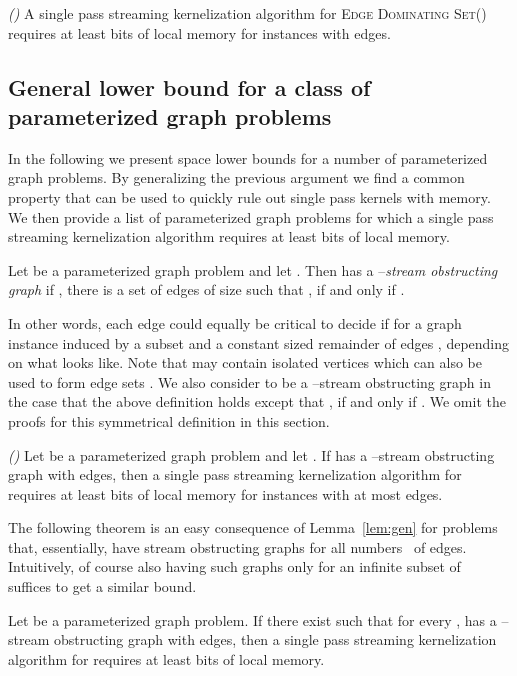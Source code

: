 \documentclass[draft,a4paper]{llncs}
\newcommand{\EDSk}{\textsc{Edge Dominating Set()}\xspace}
\begin{document}
\begin{theorem} \label{thm:eds}  \emph{()}
 A single pass streaming kernelization algorithm for \EDSk requires at least  bits of local memory for instances with  edges.
\end{theorem}


\subsection*{General lower bound for a class of parameterized graph problems}\label{ssec:singlepass:generallb}

In the following we present space lower bounds for a number of parameterized graph problems. By generalizing the previous argument we find a common property that can be used to quickly rule out single pass kernels with  memory. We then provide a list of parameterized graph problems for which a single pass streaming kernelization algorithm requires at least  bits of local memory.

\begin{definition}
 Let  be a parameterized graph problem and let . Then  has a --\emph{stream obstructing graph}  if , there is a set of edges  of size  such that ,  if and only if .
\end{definition}

In other words, each edge  could equally be critical to decide if  for a graph instance  induced by a subset  and a constant sized remainder of edges , depending on what  looks like. Note that  may contain isolated vertices which can also be used to form edge sets . We also consider  to be a --stream obstructing graph in the case that the above definition holds except that ,  if and only if . We omit the proofs for this symmetrical definition in this section.

\begin{lemma} \label{lem:gen} \emph{()}
 Let  be a parameterized graph problem and let . If  has a --stream obstructing graph  with  edges, then a single pass streaming kernelization algorithm for  requires at least  bits of local memory for instances with at most  edges.
\end{lemma}

The following theorem is an easy consequence of Lemma~\ref{lem:gen} for problems that, essentially, have stream obstructing graphs for all numbers~ of edges. Intuitively, of course also having such graphs only for an infinite subset of~ suffices to get a similar bound.

\begin{theorem} \label{thm:gen}
 Let  be a parameterized graph problem. If there exist  such that for every ,  has a --stream obstructing graph  with  edges, then a single pass streaming kernelization algorithm for  requires at least  bits of local memory.
\end{theorem}
\end{document}
